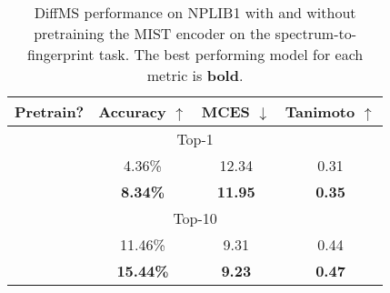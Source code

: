 \documentclass{article}
\newcommand{\cmark}{\ding{51}}%
\newcommand{\xmark}{\ding{55}}%
\theoremstyle{plain}
\theoremstyle{definition}
\theoremstyle{remark}
\newcommand{\ours}{DiffMS\xspace}
\begin{document}
\begin{table}
\renewcommand{\arraystretch}{1.1}
\vspace{-0.2in}
\caption{\ours performance on NPLIB1 with and without pretraining the MIST encoder on the spectrum-to-fingerprint task. The best performing model for each metric is \textbf{bold}.}
\label{table:ablate_encoder}
\vspace{-0.05in}
\begin{center}
\begin{tabular}{c|ccc}
\toprule
  Pretrain? & Accuracy $\uparrow$ & MCES $\downarrow$ & Tanimoto $\uparrow$ \\
 \midrule
 \midrule 
\multicolumn{4}{c}{Top-1} \\
\midrule
\xmark & 4.36\% & 12.34 & 0.31 \\
\cmark & \textbf{8.34\%} & \textbf{11.95} & \textbf{0.35} \\
\midrule 
\multicolumn{4}{c}{Top-10} \\
\midrule
\xmark & 11.46\% & 9.31 & 0.44\\
\cmark & \textbf{15.44\%} & \textbf{9.23} & \textbf{0.47} \\
\bottomrule
\end{tabular}
\end{center}
\vspace{-0.2in}
\end{table}
\end{document}
